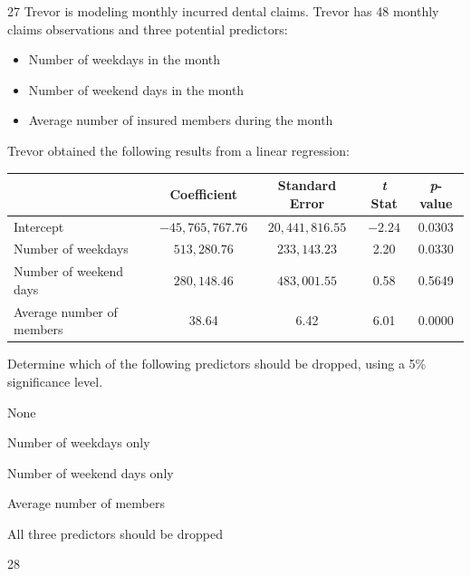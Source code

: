 \begin{question}{27}
Trevor is modeling monthly incurred dental claims. Trevor has 48 monthly claims observations and three potential predictors:
\begin{itemize}
\item Number of weekdays in the month
\item Number of weekend days in the month
\item Average number of insured members during the month
\end{itemize}
Trevor obtained the following results from a linear regression:
\begin{center}
\begin{tabular}{|l|c|c|c|c|}
\hline
 & \textbf{Coefficient} & \textbf{Standard Error} & \textbf{\textit{t} Stat} & \textbf{\textit{p}-value} \\ \hline
Intercept & $-45{,}765{,}767.76$ & $20{,}441{,}816.55$ & $-2.24$ & 0.0303 \\ \hline
Number of weekdays & $513{,}280.76$ & $233{,}143.23$ & 2.20 & 0.0330 \\ \hline
Number of weekend days & $280{,}148.46$ & $483{,}001.55$ & 0.58 & 0.5649 \\ \hline
Average number of members & 38.64 & 6.42 & 6.01 & 0.0000 \\ \hline
\end{tabular}
\end{center}

Determine which of the following predictors should be dropped, using a 5\% significance level.

\begin{choices}
\item None
\item Number of weekdays only
\item Number of weekend days only
\item Average number of members
\item All three predictors should be dropped
\end{choices}
\end{question}

\begin{question}{28}
\deleted
\end{question}


